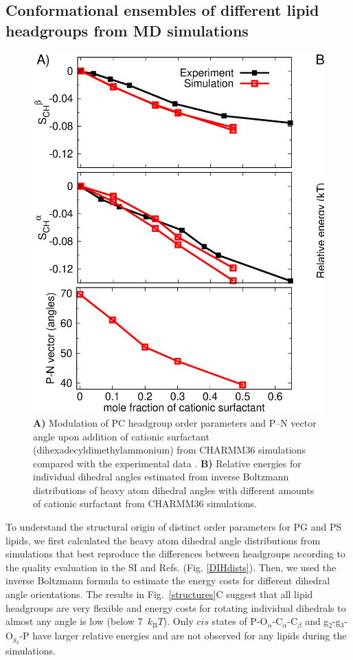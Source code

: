 \documentclass[aps,prl,superscriptaddress,twocolumn]{revtex4}
\begin{document}
\subsection{Conformational ensembles of different lipid headgroups from MD simulations}

\begin{figure}[bt]
  \centering
  \includegraphics[width=18.0cm]{./Figs/HGorderparametersPCvsSURFchangeDIHEDRALSlog.eps}
  \caption{\label{changesWITHsurf}
    \textbf{A)} Modulation of PC headgroup order parameters and P--N vector angle upon addition of cationic surfactant (dihexadecyldimethylammonium)
    from CHARMM36 simulations compared with the experimental data \cite{scherer89}.
    \textbf{B)} Relative energies for individual dihedral angles estimated from inverse Boltzmann distributions of heavy atom dihedral angles
    with different amounts of cationic surfactant from CHARMM36 simulations.
  }
\end{figure}

To understand the structural origin of distinct order parameters for PG and PS lipids,
we first calculated the heavy atom dihedral angle distributions from simulations
that best reproduce the differences between headgroups according to the quality
evaluation in the SI and Refs. \cite{botan15,antila19} (Fig. \ref{DIHdists}).
Then, we used the inverse Boltzmann formula to estimate the
energy costs for different dihedral angle orientations.
The results in Fig.~\ref{structures}C suggest that all lipid headgroups are very flexible and
energy costs for rotating individual dihedrals to almost any angle is low (below 7~$k_\mathrm{B}T$).
Only $cis$ states of P-O$_\alpha$-C$_\alpha$-C$_\beta$ and g$_2$-g$_3$-O$_{g_3}$-P have larger relative
energies and are not observed for any lipids during the simulations.
\end{document}
